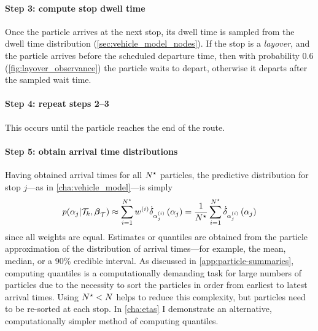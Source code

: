 \paragraph{Step 3: compute stop dwell time}
Once the particle arrives at the next stop, its dwell time is sampled from the dwell time distribution (\cref{sec:vehicle_model_nodes}). If the stop is a \emph{layover}, and the particle arrives before the scheduled departure time, then with probability 0.6 (\cref{fig:layover_observance}) the particle waits to depart, otherwise it departs after the sampled wait time.

\paragraph{Step 4: repeat steps 2--3}
This occurs until the particle reaches the end of the route.

\paragraph{Step 5: obtain arrival time distributions}
Having obtained arrival times for all $N^\star$ particles, the predictive distribution for stop $j$---as in \cref{cha:vehicle_model}---is simply
\begin{equation}
\label{eq:particle_predictive_dist}
p(\alpha_j | \mathcal{T}_k, \boldsymbol\beta_{\mathcal{T}}) \approx
\sum_{i=1}^{N^\star} w^{(i)} \dot\delta_{\alpha_j^{(i)}}\left(\alpha_j\right)
= \frac{1}{N^\star}\sum_{i=1}^{N^\star} \dot\delta_{\alpha_j^{(i)}}\left(\alpha_j\right)
\end{equation}
since all weights are equal. Estimates or quantiles are obtained from the particle approximation of the distribution of arrival times---for example, the mean, median, or a 90\% credible interval. As discussed in \cref{app:particle-summaries}, computing quantiles is a computationally demanding task for large numbers of particles due to the necessity to sort the particles in order from earliest to latest arrival times. Using $N^\star < N$ helps to reduce this complexity, but particles need to be re-sorted at each stop. In \cref{cha:etas} I demonstrate an alternative, computationally simpler method of computing quantiles.
